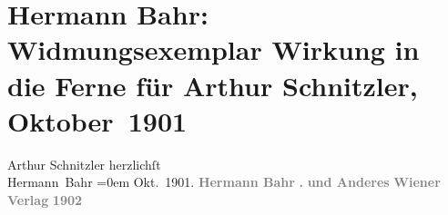 

         
         \renewcommand{\erwaehntePersonen}{Personen: Hermann Bahr}
         \renewcommand{\erwaehnteInstitutionen}{Institutionen: Wiener Verlag}
         \renewcommand{\erwaehnteOrte}{Orte: Wien}
         \renewcommand{\erwaehnteWerke}{Werke: Wirkung in die Ferne und Anderes}
               \section[Hermann Bahr: Widmungsexemplar Wirkung in die Ferne für Arthur Schnitzler, Oktober 1901]{ Hermann Bahr: Widmungsexemplar Wirkung in die Ferne für Arthur
               Schnitzler, Oktober 1901}\nopagebreak{}\rehead{ }\begin{ledgroupsized}[t]{13cm}\normalsize\beginnumbering \toendnotes[C]{\smallbreak\pagebreak[2]} 
\pstart
           \noindent{}{\pb}Arthur Schnitzler\pend
           \pstart
           herzlichſt{\\[\baselineskip]}\spacefill\mbox{Hermann Bahr}\pend
           \leftskip=0em{}\pstart
           \noindent{}Okt. 1901. \pend
           {\bigskip}\pstart
           \noindent{}\centering{}\textcolor{gray}{\textbf{\textbf{Hermann Bahr}}}\pend
           \pstart
           \noindent{}\centering{}\textcolor{gray}{\textbf{.}}\pend
           \pstart
           \noindent{}\centering{}\textcolor{gray}{\textbf{und Anderes}}\pend
           {\bigskip}\pstart
           \noindent{}\centering{}\textcolor{gray}{\textbf{Wiener Verlag}}\pend
           \pstart
           \noindent{}\centering{}\textcolor{gray}{\textbf{1902}}\pend
           
         
         \endnumbering{}\end{ledgroupsized}  \newcommand{\dateiname}{L01178}\newcommand{\titel}{Hermann Bahr: Widmungsexemplar Wirkung in die Ferne für Arthur Schnitzler, Oktober 1901}\newcommand{\editorInnen}{ Martin Anton Müller und  Gerd Hermann Susen}
      